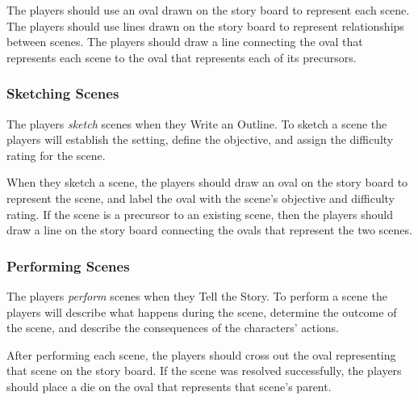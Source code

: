 \documentclass[12pt, a5paper, parskip=half-]{scrartcl}
\begin{document}
The players should use an oval drawn on the story board to represent each scene.
The players should use lines drawn on the story board to represent relationships between scenes.
The players should draw a line connecting the oval that represents each scene to the oval that represents each of its precursors.

\newpage

\subsubsection*{Sketching Scenes}
The players \emph{sketch} scenes when they {\cinzel \small Write an Outline}. 
To sketch a scene the players will establish the setting, define the objective, and assign the difficulty rating for the scene.

When they sketch a scene, the players should draw an oval on the story board to represent the scene, and label the oval with the scene's objective and difficulty rating.
If the scene is a precursor to an existing scene, then the players should draw a line on the story board connecting the ovals that represent the two scenes.

\subsubsection*{Performing Scenes}
The players \emph{perform} scenes when they {\cinzel \small Tell the Story}.
To perform a scene the players will describe what happens during the scene, determine the outcome of the scene, and describe the consequences of the characters' actions.

After performing each scene, the players should cross out the oval representing that scene on the story board. If the scene was resolved successfully, the players should place a die on the oval that represents that scene's parent.
\newpage
\end{document}
